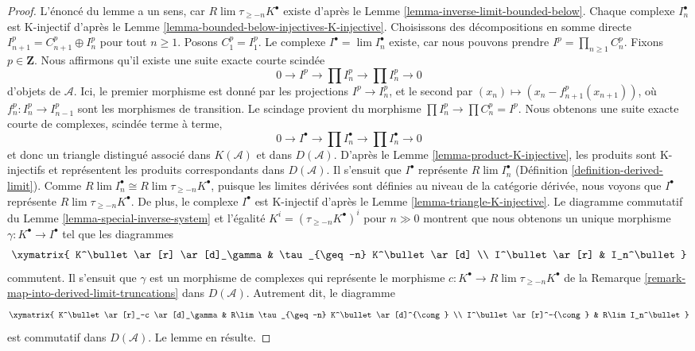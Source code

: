 \begin{proof}
L'énoncé du lemme a un sens, car
$R\lim \tau_{\geq -n}K^\bullet$ existe d'après le
Lemme \ref{lemma-inverse-limit-bounded-below}.
Chaque complexe $I_n^\bullet$ est K-injectif d'après le
Lemme \ref{lemma-bounded-below-injectives-K-injective}.
Choisissons des décompositions en somme directe
$I_{n + 1}^p = C_{n + 1}^p \oplus I_n^p$ pour tout $n \geq 1$.
Posons $C_1^p = I_1^p$. Le complexe $I^\bullet = \lim I_n^\bullet$ existe,
car nous pouvons prendre $I^p = \prod_{n \geq 1} C_n^p$.
Fixons $p \in \mathbf{Z}$. Nous affirmons qu'il existe une suite exacte
courte scindée
$$
0 \to I^p \to \prod I_n^p \to \prod I_n^p \to 0
$$
d'objets de $\mathcal{A}$. Ici, le premier morphisme est donné par les
projections $I^p \to I_n^p$, et le second par
$(x_n) \mapsto (x_n - f^p_{n + 1}(x_{n + 1}))$, où
$f^p_n : I_n^p \to I_{n - 1}^p$ sont les morphismes de transition.
Le scindage provient du morphisme
$\prod I_n^p \to \prod C_n^p = I^p$.
Nous obtenons une suite exacte courte de complexes, scindée terme à terme,
$$
0 \to I^\bullet \to \prod I_n^\bullet \to \prod I_n^\bullet \to 0
$$
et donc un triangle distingué associé dans $K(\mathcal{A})$ et dans
$D(\mathcal{A})$. D'après le Lemme \ref{lemma-product-K-injective}, les
produits sont K-injectifs et représentent les produits correspondants dans
$D(\mathcal{A})$.
Il s'ensuit que $I^\bullet$ représente $R\lim I_n^\bullet$
(Définition \ref{definition-derived-limit}).
Comme $R\lim I_n^\bullet \cong R\lim \tau_{\geq -n}K^\bullet$, puisque les
limites dérivées sont définies au niveau de la catégorie dérivée, nous voyons
que $I^\bullet$ représente $R\lim \tau_{\geq -n}K^\bullet$.
De plus, le complexe $I^\bullet$ est K-injectif d'après le
Lemme \ref{lemma-triangle-K-injective}.
Le diagramme commutatif du Lemme \ref{lemma-special-inverse-system} et
l'égalité $K^i = (\tau_{\geq -n}K^\bullet)^i$ pour $n \gg 0$ montrent que
nous obtenons un unique morphisme $\gamma : K^\bullet \to I^\bullet$ tel que
les diagrammes
$$
\xymatrix{
K^\bullet \ar[r] \ar[d]_\gamma & \tau_{\geq -n} K^\bullet \ar[d] \\
I^\bullet \ar[r] & I_n^\bullet
}
$$
commutent. Il s'ensuit que $\gamma$ est un morphisme de complexes qui
représente le morphisme
$c : K^\bullet \to R\lim \tau_{\geq -n}K^\bullet$ de la
Remarque \ref{remark-map-into-derived-limit-truncations} dans
$D(\mathcal{A})$. Autrement dit, le diagramme
$$
\xymatrix{
K^\bullet \ar[r]_-c \ar[d]_\gamma & R\lim \tau_{\geq -n} K^\bullet
\ar[d]^{\cong} \\
I^\bullet \ar[r]^-{\cong} & R\lim I_n^\bullet
}
$$
est commutatif dans $D(\mathcal{A})$. Le lemme en résulte.
\end{proof}

